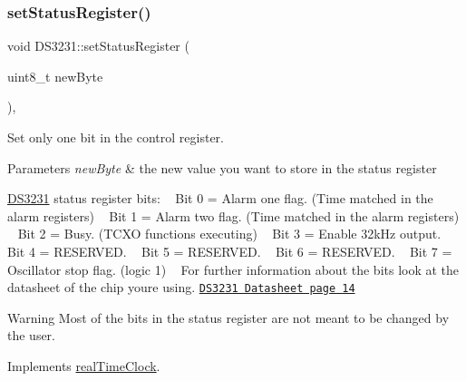 \subsubsection{\texorpdfstring{set\+Status\+Register()}{setStatusRegister()}}
{\footnotesize\ttfamily void D\+S3231\+::set\+Status\+Register (\begin{DoxyParamCaption}\item[{uint8\+\_\+t}]{new\+Byte }\end{DoxyParamCaption})\hspace{0.3cm}{\ttfamily [override]}, {\ttfamily [virtual]}}



Set only one bit in the control register. 


\begin{DoxyParams}{Parameters}
{\em new\+Byte} & the new value you want to store in the status register\\
\hline
\end{DoxyParams}
\mbox{\hyperlink{class_d_s3231}{D\+S3231}} status register bits\+: ~\newline
 Bit 0 = Alarm one flag. (Time matched in the alarm registers) ~\newline
 Bit 1 = Alarm two flag. (Time matched in the alarm registers) ~\newline
 Bit 2 = Busy. (T\+C\+XO functions executing) ~\newline
 Bit 3 = Enable 32k\+Hz output. ~\newline
 Bit 4 = R\+E\+S\+E\+R\+V\+ED. ~\newline
 Bit 5 = R\+E\+S\+E\+R\+V\+ED. ~\newline
 Bit 6 = R\+E\+S\+E\+R\+V\+ED. ~\newline
 Bit 7 = Oscillator stop flag. (logic 1) ~\newline
 For further information about the bits look at the datasheet of the chip you\textquotesingle{}re using. \href{https://datasheets.maximintegrated.com/en/ds/DS3231.pdf}{\tt D\+S3231 Datasheet page 14} \begin{DoxyWarning}{Warning}
Most of the bits in the status register are not meant to be changed by the user. 
\end{DoxyWarning}


Implements \mbox{\hyperlink{classreal_time_clock_aa8ee80a7056c67543834508d0f04a218}{real\+Time\+Clock}}.

\mbox{\label{class_d_s3231_a143ec57122d892ea0ec671a153352f2c}} 
